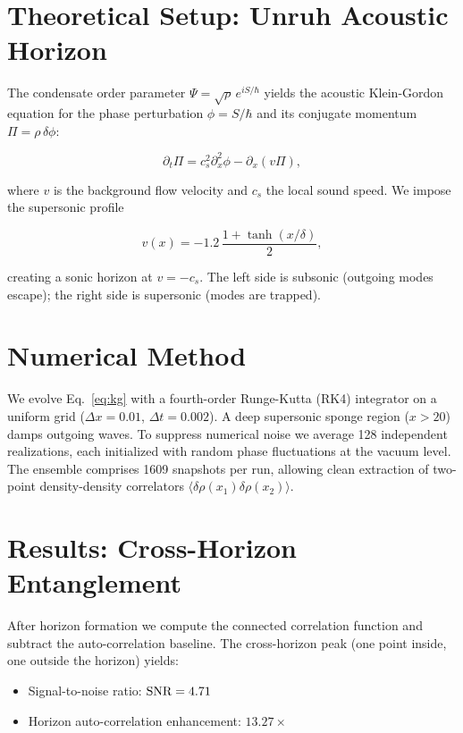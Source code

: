 \documentclass[reprint,amsmath,amssymb,aps,prl,superscriptaddress]{revtex4-2}
\begin{document}
\section{Theoretical Setup: Unruh Acoustic Horizon}
\label{sec:setup}

The condensate order parameter $\Psi=\sqrt{\rho}\,e^{iS/\hbar}$ yields the acoustic Klein-Gordon equation for the phase perturbation $\phi=S/\hbar$ and its conjugate momentum $\Pi=\rho\,\delta\phi$:

\begin{equation}
\partial_t\Pi=c_s^2\partial_x^2\phi-\partial_x(v\Pi),
\label{eq:kg}
\end{equation}

where $v$ is the background flow velocity and $c_s$ the local sound speed. We impose the supersonic profile

\begin{equation}
v(x)=-1.2\,\frac{1+\tanh(x/\delta)}{2},
\label{eq:profile}
\end{equation}

creating a sonic horizon at $v=-c_s$. The left side is subsonic (outgoing modes escape); the right side is supersonic (modes are trapped).

\section{Numerical Method}
\label{sec:method}

We evolve Eq.~\eqref{eq:kg} with a fourth-order Runge-Kutta (RK4) integrator on a uniform grid ($\Delta x=0.01$, $\Delta t=0.002$). A deep supersonic sponge region ($x>20$) damps outgoing waves. To suppress numerical noise we average 128 independent realizations, each initialized with random phase fluctuations at the vacuum level. The ensemble comprises 1609 snapshots per run, allowing clean extraction of two-point density-density correlators $\langle\delta\rho(x_1)\delta\rho(x_2)\rangle$.

\section{Results: Cross-Horizon Entanglement}
\label{sec:results}

After horizon formation we compute the connected correlation function and subtract the auto-correlation baseline. The cross-horizon peak (one point inside, one outside the horizon) yields:

\begin{itemize}
\item Signal-to-noise ratio: $\rm SNR=4.71$
\item Horizon auto-correlation enhancement: $13.27\times$
\end{itemize}
\end{document}
